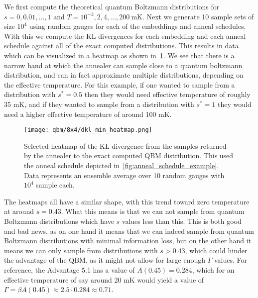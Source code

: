We first compute the theoretical quantum Boltzmann distributions for \( s = 0, 0.01, \dots, 1 \) and \( T = 10^{-3}, 2, 4, \dots, 200 \ \si{\milli\kelvin} \).
Next we generate 10 sample sets of size \( 10^4 \) using random gauges for each of the embeddings and anneal schedules.
With this we compute the KL divergences for each embedding and each anneal schedule against all of the exact computed distributions.
This results in data which can be visualized in a heatmap as shown in~\cref{fig:dkl_min_heatmap}.
We see that there is a narrow band at which the annealer can sample close to a quantum boltzmann distribution, and can in fact approximate multiple distributions, depending on the effective temperature.
For this example, if one wanted to sample from a distribution with \( s^* = 0.5 \) then they would need effective temperature of roughly 35 \si{\milli\kelvin}, and if they wanted to sample from a distribution with \( s^* = 1 \) they would need a higher effective temperature of around 100 \si{\milli\kelvin}.

\begin{figure}[!htb]
    \begin{center}
        \texttt{[image: qbm/8x4/dkl\_min\_heatmap.png]}
    \end{center}
    \caption{Selected heatmap of the KL divergence from the samples returned by the annealer to the exact computed QBM distribution. This used the anneal schedule depicted in~\cref{fig:anneal_schedule_example}. Data represents an ensemble average over 10 random gauges with \( 10^4 \) sample each.}
    \label{fig:dkl_min_heatmap}
\end{figure}

The heatmaps all have a similar shape, with this trend toward zero temperature at around \( s = 0.43 \).
What this means is that we can not sample from quantum Boltzmann distributions which have \( s \) values less than this.
This is both good and bad news, as on one hand it means that we can indeed sample from quantum Boltzmann distributions with minimal information loss, but on the other hand it means we can only sample from distributions with \( s > 0.43 \), which could hinder the advantage of the QBM, as it might not allow for large enough \( \Gamma \) values.
For reference, the Advantage 5.1 has a value of \( A(0.45) = 0.284 \), which for an effective temperature of say around 20 \si{\milli\kelvin} would yield a value of \( \Gamma = \beta A(0.45) \approx 2.5 \cdot 0.284 \approx 0.71 \).

